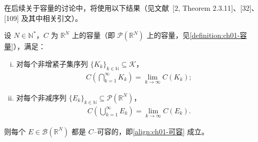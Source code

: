 \documentclass[../../main.tex]{subfiles}%
\begin{document}
在后续关于容量的讨论中，将使用以下结果（见文献~[2, Theorem 2.3.11]、[32]、[109] 及其中相关引文）。

\begin{theorem}[Choquet]\label{theorem:ch01-Choquet}
设 $N\in\mathbb{N}^*$，$C$ 为 $\mathbb{R}^N$ 上的容量（即 $\mathcal{P}(\mathbb{R}^N)$ 上的容量，见\cref{definition:ch01-容量}），满足：
\begin{enumerate}[(i)]
\item 对每个非增紧子集序列 $\{K_k\}_{k\in\mathbb{N}}\subseteq\mathcal{K}$，
\begin{align}
C\left(\bigcap_{k=1}^\infty K_k\right)=\lim_{k\to\infty}C(K_k); \label{align:ch01-Choquet上连续}
\end{align}
\item 对每个非减序列 $\{E_k\}_{k\in\mathbb{N}}\subseteq\mathcal{P}(\mathbb{R}^N)$，
\begin{align}
C\left(\bigcup_{k=1}^\infty E_k\right)=\lim_{k\to\infty}C(E_k). \label{align:ch01-Choquet下连续}
\end{align}
\end{enumerate}
则每个 $E\in\mathcal{B}(\mathbb{R}^N)$ 都是 $C$--可容的，即\eqref{align:ch01-可容} 成立。
\end{theorem}
\end{document}
